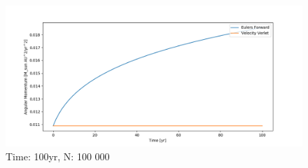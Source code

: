 \documentclass{article}
\begin{document}
\begin{figure}[H]
  \centering
  \includegraphics[width=1.0\textwidth]{plots/angular_both.png}
  \caption{Time: 100yr, N: 100 000}
\end{figure}
\end{document}
